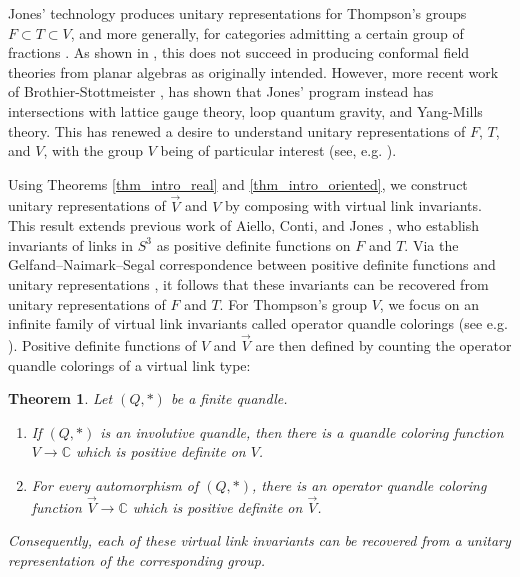 \documentclass[11pt, twoside]{amsart}
\numberwithin{equation}{section}
\newtheorem{thm}{Theorem}
\theoremstyle{definition}
\numberwithin{equation}{section}
\begin{document}
Jones' technology produces unitary representations for Thompson's groups $F \subset T \subset V$, and more generally, for categories admitting a certain group of fractions \cite{jones_no_go}. As shown in \cite{jones_no_go}, this does not succeed in producing conformal field theories from planar algebras as originally intended. However, more recent work of Brothier-Stottmeister  \cite{brothier_stottmeister_1,brothier_stottmeister_2}, has shown that Jones' program instead has intersections with lattice gauge theory, loop quantum gravity, and Yang-Mills theory. This has renewed a desire to understand unitary representations of $F$, $T$, and $V$, with the group $V$ being of particular interest (see, e.g. \cite{brothier_jones_a,brothier_jones_b, brothier_survey,brothier_wreath,brothier_classification}). 

Using Theorems \ref{thm_intro_real} and \ref{thm_intro_oriented}, we construct unitary representations of $\vec{V}$ and $V$ by composing with virtual link invariants. This result extends previous work of Aiello, Conti, and Jones \cite{jones_unitary,AC19,ac19oriented, aiellocontijones}, who establish invariants of links in $S^3$ as positive definite functions on $F$ and $T$. Via the Gelfand–Naimark–Segal correspondence between positive definite functions and unitary representations \cite{GN43, Seg47}, it follows that these invariants can be recovered from unitary representations of $F$ and $T$. For Thompson's group $V$, we focus on an infinite family of virtual link invariants called operator quandle colorings (see e.g. \cite{KMV25}). Positive definite functions of $V$ and $\vec{V}$ are then defined by counting the operator quandle colorings of a virtual link type: 

\begin{thm}\label{intro-thm-operator-quandle}
Let $(Q,*)$ be a finite quandle.
\begin{enumerate}
    \item If $(Q,*)$ is an involutive quandle, then there is a quandle coloring function $V\to \mathbb{C}$ which is positive definite on $V$.
    \item For every automorphism of $(Q,*)$, there is an operator quandle coloring function $\vec{V}\to \mathbb{C}$ which is positive definite on $\vec{V}$.
\end{enumerate}
Consequently, each of these virtual link invariants can be recovered from a unitary representation of the corresponding group. 
\end{thm}
\end{document}
